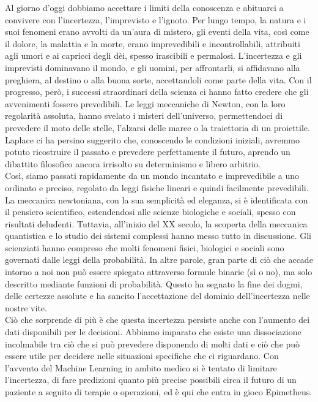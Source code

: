 Al giorno d'oggi dobbiamo accettare i limiti della conoscenza e abituarci a convivere con l'incertezza, l'imprevisto e l'ignoto. Per lungo tempo, la natura e i suoi fenomeni erano avvolti da un'aura di mistero, gli eventi della vita, così come il dolore, la malattia e la morte, erano imprevedibili e incontrollabili, attribuiti agli umori e ai capricci degli dèi, spesso irascibili e permalosi. L'incertezza e gli imprevisti dominavano il mondo, e gli uomini, per affrontarli, si affidavano alla preghiera, al destino o alla buona sorte, accettandoli come parte della vita. Con il progresso, però, i successi straordinari della scienza ci hanno fatto credere che gli avvenimenti fossero prevedibili. Le leggi meccaniche di Newton, con la loro regolarità assoluta, hanno svelato i misteri dell'universo, permettendoci di prevedere il moto delle stelle, l'alzarsi delle maree o la traiettoria di un proiettile. Laplace ci ha persino suggerito che, conoscendo le condizioni iniziali, avremmo potuto ricostruire il passato e prevedere perfettamente il futuro, aprendo un dibattito filosofico ancora irrisolto su determinismo e libero arbitrio.
\\
Così, siamo passati rapidamente da un mondo incantato e imprevedibile a uno ordinato e preciso, regolato da leggi fisiche lineari e quindi facilmente prevedibili. La meccanica newtoniana, con la sua semplicità ed eleganza, si è identificata con il pensiero scientifico, estendendosi alle scienze biologiche e sociali, spesso con risultati deludenti. Tuttavia, all'inizio del XX secolo, la scoperta della meccanica quantistica e lo studio dei sistemi complessi hanno messo tutto in discussione. Gli scienziati hanno compreso che molti fenomeni fisici, biologici e sociali sono governati dalle leggi della probabilità. In altre parole, gran parte di ciò che accade intorno a noi non può essere spiegato attraverso formule binarie (sì o no), ma solo descritto mediante funzioni di probabilità. Questo ha segnato la fine dei dogmi, delle certezze assolute e ha sancito l'accettazione del dominio dell'incertezza nelle nostre vite.
\\
Ciò che sorprende di più è che questa incertezza persiste anche con l'aumento dei dati disponibili per le decisioni. Abbiamo imparato che esiste una dissociazione incolmabile tra ciò che si può prevedere disponendo di molti dati e ciò che può essere utile per decidere nelle situazioni specifiche che ci riguardano. 
Con l'avvento del Machine Learning in ambito medico si è tentato di limitare l'incertezza, di fare predizioni quanto più precise possibili circa il futuro di un paziente a seguito di terapie o operazioni, ed è qui che entra in gioco Epimetheus.
